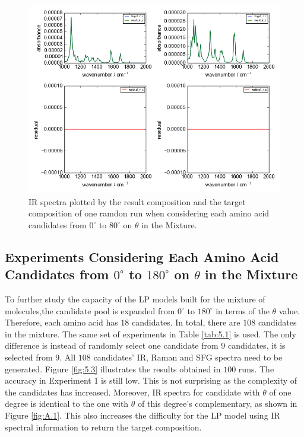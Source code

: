 \begin{figure}[!ht] 
\centering
\includegraphics[scale=0.7]{Figures/chapter5_result_target_residual_plotting__ir_result8_run1.png}
\caption{IR spectra plotted by the result composition and the target composition of one ramdon run when considering each amino acid candidates from $0^{\circ}$ to $80^{\circ}$ on $\theta$ in the Mixture.} \label{fig:5.2}
\end{figure}

\subsection{Experiments Considering Each Amino Acid Candidates from $0^{\circ}$ to $180^{\circ}$ on $\theta$ in the Mixture}
To further study the capacity of the LP models built for the mixture of molecules,the candidate pool is expanded from $0^{\circ}$ to $180^{\circ}$ in terms of the $\theta$ value. Therefore, each amino acid has $18$ candidates. In total, there are $108$ candidates in the mixture. The same set of experiments in Table \ref{tab:5.1} is used. The only difference is instead of randomly select one candidate from $9$ candidates, it is selected from $9$. All $108$ candidates' IR, Raman and SFG spectra need to be generated. Figure \ref{fig:5.3} illustrates the results obtained in $100$ runs. The accuracy in Experiment 1 is still low. This is not surprising as the complexity of the candidates has increased. Moreover, IR spectra for candidate with $\theta$ of one degree is identical to the one with $\theta$ of this degree's complementary, as shown in Figure \ref{fig:A.1}. This also increases the difficulty for the LP model using IR spectral information to return the target composition. \\

